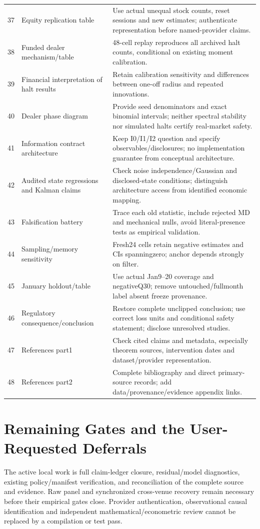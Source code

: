 \begin{longtable}{rp{}p{}}
37 & Equity replication table & Use actual unequal stock counts, reset sessions and new estimates; authenticate representation before named-provider claims.\\
38 & Funded dealer mechanism/\allowbreak table & 48-cell replay reproduces all archived halt counts, conditional on existing moment calibration.\\
39 & Financial interpretation of halt results & Retain calibration sensitivity and differences between one-off radius and repeated innovations.\\
40 & Dealer phase diagram & Provide seed denominators and exact binomial intervals; neither spectral stability nor simulated halts certify real-market safety.\\
41 & Information contract architecture & Keep I0/I1/I2 question and specify observables/disclosures; no implementation guarantee from conceptual architecture.\\
42 & Audited state regressions and Kalman claims & Check noise independence/Gaussian and disclosed-state conditions; distinguish architecture access from identified economic mapping.\\
43 & Falsification battery & Trace each old statistic, include rejected MD and mechanical nulls, avoid literal-presence tests as empirical validation.\\
44 & Sampling/\allowbreak memory sensitivity & Fresh24 cells retain negative estimates and CIs spanningzero; anchor depends strongly on filter.\\
45 & January holdout/\allowbreak table & Use actual Jan9–20 coverage and negativeQ30; remove untouched/fullmonth label absent freeze provenance.\\
46 & Regulatory consequence/\allowbreak conclusion & Restore complete unclipped conclusion; use correct loss units and conditional safety statement; disclose unresolved studies.\\
47 & References part1 & Check cited claims and metadata, especially theorem sources, intervention dates and dataset/provider representation.\\
48 & References part2 & Complete bibliography and direct primary-source records; add data/provenance/evidence appendix links.\\
\end{longtable}
\section{Remaining Gates and the User-Requested Deferrals}
The active local work is full claim-ledger closure, residual/model diagnostics, existing policy/manifest verification, and reconciliation of the complete source and evidence. Raw panel and synchronized cross-venue recovery remain necessary before their empirical gates close. Provider authentication, observational causal identification and independent mathematical/econometric review cannot be replaced by a compilation or test pass.

